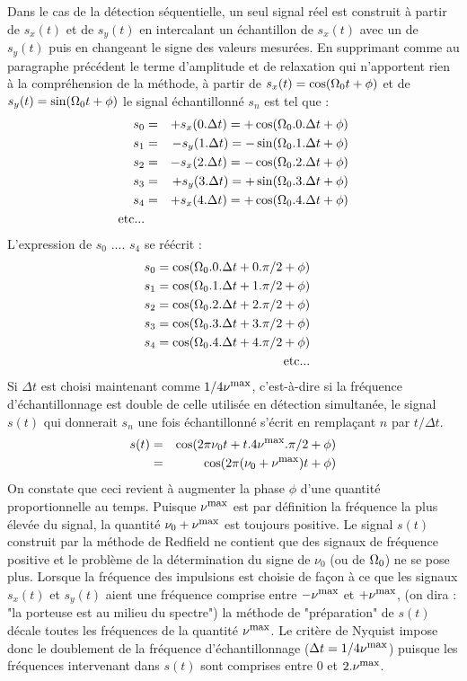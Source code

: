 Dans le cas de la détection séquentielle,
un seul signal réel est construit à partir de $s_x(t)$ et de $s_y(t)$
en intercalant un échantillon de $s_x(t)$ avec un de
$s_y(t)$ puis en changeant le signe des valeurs mesurées.
En supprimant comme au paragraphe précédent le terme
d'amplitude et de relaxation qui n'apportent rien à la compréhension de la méthode,
à partir de $s_x(t) = \cos(\Omega_0 t + \phi)$ et de $s_y(t) = \sin(\Omega_0 t + \phi)$
le signal échantillonné $s_n$ est tel
que :
\begin{eqnarray}
s_0 & = & +s_x(0 . \Delta t) = +\cos(\Omega_0.0.\Delta t + \phi) \\
s_1 & = & -s_y(1 . \Delta t) = -\sin(\Omega_0.1.\Delta t + \phi) \\
s_2 & = & -s_x(2 . \Delta t) = -\cos(\Omega_0.2.\Delta t + \phi) \\
s_3 & = & +s_y(3 . \Delta t) = +\sin(\Omega_0.3.\Delta t + \phi) \\
s_4 & = & +s_x(4 . \Delta t) = +\cos(\Omega_0.4.\Delta t + \phi) \\
\mbox{etc...} & &
\end{eqnarray}
L'expression de $s_0$ .... $s_4$ se réécrit  :
\begin{eqnarray}
s_0 =  \cos(\Omega_0.0.\Delta t + 0 . \pi/2 + \phi) \\
s_1 =  \cos(\Omega_0.1.\Delta t + 1 . \pi/2 + \phi) \\
s_2 =  \cos(\Omega_0.2.\Delta t + 2 . \pi/2 + \phi) \\
s_3 =  \cos(\Omega_0.3.\Delta t + 3 . \pi/2 + \phi) \\
s_4 =  \cos(\Omega_0.4.\Delta t + 4 . \pi/2 + \phi) \\
\mbox{etc...} & &
\end{eqnarray}
Si $\Delta t$ est choisi maintenant comme $1/4\nu^{\mbox{\footnotesize{max}}}$, c'est-à-dire si la fréquence
d'échantillonnage est double de celle utilisée en détection simultanée, 
le signal $s(t)$ qui
donnerait $s_n$ une fois échantillonné s'écrit en remplaçant $n$ par $t/\Delta t$.
\begin{eqnarray}
s(t) & = & \cos(2\pi\nu_0 t + t.4\nu^{\mbox{\footnotesize{max}}}.\pi/2 + \phi) \\
     & = & \cos(2\pi(\nu_0 + \nu^{\mbox{\footnotesize{max}}})t + \phi)
\end{eqnarray}
On constate que ceci revient à augmenter la phase $\phi$ d'une quantité
proportionnelle au temps.
Puisque $\nu^{\mbox{\footnotesize{max}}}$ est par définition la fréquence la plus élevée du signal,
la quantité $\nu_0 + \nu^{\mbox{\footnotesize{max}}}$ est toujours positive.
Le signal $s(t)$ construit par la méthode de Redfield ne
contient que des signaux de fréquence positive et le problème de la détermination du
signe de $\nu_0$ (ou de $\Omega_0$) ne se pose plus.
Lorsque la fréquence des impulsions est choisie
de façon à ce que les signaux $s_x(t)$ et $s_y(t)$ aient une fréquence comprise entre
$-\nu^{\mbox{\footnotesize{max}}}$ et $+\nu^{\mbox{\footnotesize{max}}}$,
(on dira : "la porteuse est au milieu du spectre") la méthode de "préparation" de
$s(t)$ décale toutes les fréquences de la quantité $\nu^{\mbox{\footnotesize{max}}}$.
Le critère de Nyquist impose donc le
doublement de la fréquence d'échantillonnage ($\Delta t = 1/4\nu^{\mbox{\footnotesize{max}}}$) puisque les fréquences
intervenant dans $s(t)$ sont comprises entre 0 et $2.\nu^{\mbox{\footnotesize{max}}}$.

